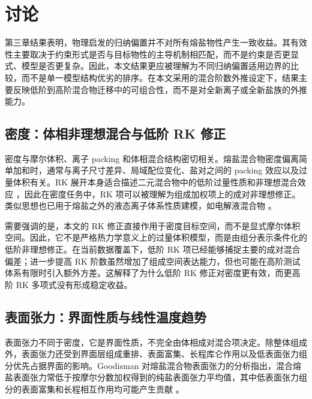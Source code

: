 \documentclass[journal=jctcce,manuscript=article,doi=true]{achemso}
\begin{document}
\section{讨论}\label{ux8ba8ux8bba}

第三章结果表明，物理启发的归纳偏置并不对所有熔盐物性产生一致收益。其有效性主要取决于约束形式是否与目标物性的主导机制相匹配，而不是约束是否更显式、模型是否更复杂。因此，本文结果更应被理解为不同归纳偏置适用边界的比较，而不是单一模型结构优劣的排序。在本文采用的混合阶数外推设定下，结果主要反映低阶到高阶混合物迁移中的可组合性，而不是对全新离子或全新盐族的外推能力。

\subsection{密度：体相非理想混合与低阶 RK 修正}\label{ux5bc6ux5ea6ux4f53ux76f8ux975eux7406ux60f3ux6df7ux5408ux4e0e-rk-ux4feeux6b63}

密度与摩尔体积、离子 packing 和体相混合结构密切相关。熔盐混合物密度偏离简单加和时，通常与离子尺寸差异、局域配位变化、盐对之间的 packing 效应以及过量体积有关。RK 展开本身适合描述二元混合物中的低阶过量性质和非理想混合效应 \cite{redlich1948algebraic,birri2022redlich,birri2024viscosity,prausnitz1999molecular}，因此在密度任务中，RK 项可以被理解为组成加权项上的成对非理想修正。类似思想也已用于熔盐之外的液态离子体系性质建模，如电解液混合物 \cite{zhu2024diffmix}。

需要强调的是，本文的 RK 修正直接作用于密度目标空间，而不是显式摩尔体积空间。因此，它不是严格热力学意义上的过量体积模型，而是由组分表示条件化的低阶非理想修正。在当前数据覆盖下，低阶 RK 项已经能够捕捉主要的成对混合偏差；进一步提高 RK 阶数虽然增加了组成空间表达能力，但也可能在高阶测试体系有限时引入额外方差。这解释了为什么低阶 RK 修正对密度更有效，而更高阶 RK 多项式没有形成稳定收益。

\subsection{表面张力：界面性质与线性温度趋势}\label{ux8868ux9762ux5f20ux529bux754cux9762ux6027ux8d28ux4e0eux7ebfux6027ux6e29ux5ea6ux8d8bux52bf}

表面张力不同于密度，它是界面性质，不完全由体相成对混合项决定。除整体组成外，表面张力还受到界面层组成重排、表面富集、长程库仑作用以及低表面张力组分优先占据界面的影响。Goodisman 对熔盐混合物表面张力的分析指出，混合熔盐表面张力常低于按摩尔分数加权得到的纯盐表面张力平均值，其中低表面张力组分的表面富集和长程相互作用均可能产生贡献 \cite{goodisman1980surface}。
\end{document}
